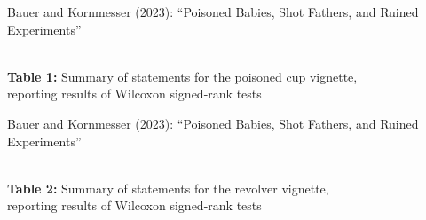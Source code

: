 \documentclass[xcolor=table,9pt,aspectratio=169]{beamer}
\begin{document}
\begin{frame}{\vspace*{10mm}Bauer and Kornmesser (2023): ``Poisoned Babies, Shot Fathers, and Ruined Experiments''}
\vspace*{-5mm}
\begin{center}
   \\
   {\footnotesize\textbf{Table 1:} Summary of statements for the poisoned cup vignette,\\reporting results of Wilcoxon signed-rank tests}
\end{center}
\end{frame}


\begin{frame}{\vspace*{10mm}Bauer and Kornmesser (2023): ``Poisoned Babies, Shot Fathers, and Ruined Experiments''}
\vspace*{-5mm}
\begin{center}
   \\
   {\footnotesize\textbf{Table 2:} Summary of statements for the revolver vignette,\\reporting results of Wilcoxon signed-rank tests}
\end{center}
\end{frame}
\end{document}
